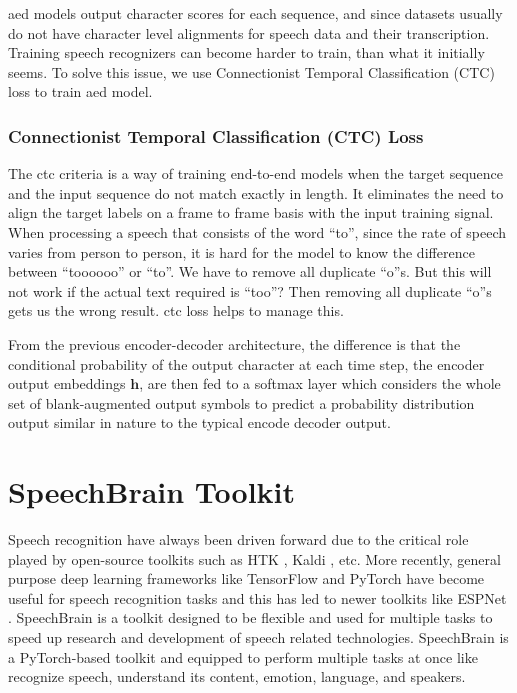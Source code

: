 \acrshort{aed} models output character scores for each sequence, and since datasets usually do not have character level alignments for speech data and their transcription. Training speech recognizers can become harder to train, than what it initially seems. To solve this issue, we use Connectionist Temporal Classification (CTC) loss to train \acrshort{aed} model.

\subsubsection{Connectionist Temporal Classification (CTC) Loss}
\label{section:ctc}
The \acrshort{ctc} criteria is a way of training end-to-end models when the target sequence and the input sequence do not match exactly in length. It eliminates the need to align the target labels on a frame to frame basis with the input training signal. When processing a speech that consists of the word ``to'', since the rate of speech varies from person to person, it is hard for the model to know the difference between ``toooooo'' or ``to''. We have to remove all duplicate ``o''s. But this will not work if the actual text required is ``too''? Then removing all duplicate ``o''s gets us the wrong result. \acrshort{ctc} loss helps to manage this.

From the previous encoder-decoder architecture, the difference is that the conditional probability of the output character at each time step, the encoder output embeddings $\mathbf{h}$, are then fed to a softmax layer which considers the whole set of blank-augmented output symbols to predict a probability distribution output similar in nature to the typical encode decoder output.


\section{SpeechBrain Toolkit}
\label{section:sb}
Speech recognition have always been driven forward due to the critical role played by open-source toolkits such as HTK \cite{Young2002TheBook}, Kaldi \cite{Povey2011TheToolkit}, etc. More recently, general purpose deep learning frameworks like TensorFlow \cite{Abadi2016TensorFlow:Systems} and PyTorch \cite{Paszke2019PyTorch:Library} have become useful for speech recognition tasks and this has led to newer toolkits like ESPNet \cite{Watanabe2018ESPnet:Toolkit}. SpeechBrain \cite{Ravanelli2021SpeechBrain:Toolkit} is a toolkit designed to be flexible and used for multiple tasks to speed up research and development of speech related technologies.  SpeechBrain is a PyTorch-based toolkit and equipped to perform multiple tasks at once like recognize speech, understand its content, emotion, language, and speakers. 

